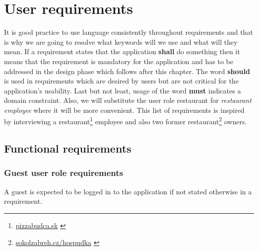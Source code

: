 \section{User requirements}
It is good practice to use language consistently throughout requirements and that is why we are going to resolve what keywords will we use and what will they mean.
If a requirement states that the application \textbf{shall} do something then it means that the requirement is mandatory for the application and has to be addressed in the design phase which follows after this chapter. 
The word \textbf{should} is used in requirements which are desired by users but are not critical for the application's usability.
Last but not least, usage of the word \textbf{must} indicates a domain constraint.
Also, we will substitute the user role restaurant for \emph{restaurant employee} where it will be more convenient.
This list of requirements is inspired by interviewing a restaurant\footnote{\url{pizzabudca.sk}  \label{fnlabel}} employee and also two former restaurant\footnote{\url{sokolzabreh.cz/hospudka}  \label{fnlabel}} owners.

\subsection{Functional requirements}
\subsubsection{Guest user role requirements}
A guest is expected to be logged in to the application if not stated otherwise in a requirement.

